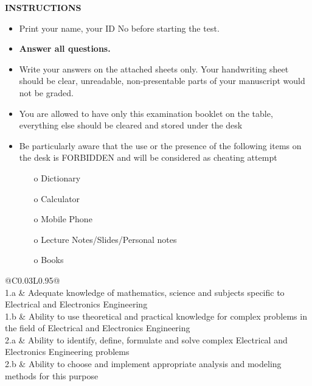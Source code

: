 \documentclass[a4paper, 11pt]{article}
\begin{document}
	\begin{center}
		\large
		\textbf{INSTRUCTIONS}
	\end{center}
	\begin{itemize}
		\setlength{\itemsep}{0pt}
		\setlength{\parskip}{1pt}
		\item Print your name, your ID No before starting the test.
		\item \textbf{Answer all questions.}
		\item Write your answers on the attached sheets only. Your handwriting sheet should be clear, unreadable, non-presentable parts of your manuscript would not be graded.
		\item You are allowed to have only this examination booklet on the table, everything else should be cleared and stored under the desk
		\item Be particularly aware that the use or the presence of the following items on the desk is FORBIDDEN and will be considered as cheating attempt
		\begin{itemize}
			\setlength{\itemsep}{0pt}
			\setlength{\parskip}{1pt}
			\item[o] Dictionary
			\item[o] Calculator
			\item[o] Mobile Phone
			\item[o] Lecture Notes/Slides/Personal notes
			\item[o] Books
		\end{itemize}
	\end{itemize}
	
	\begin{table}[hb!]
		\centering
		\begin{tabular}{@{}C{0.03\linewidth}L{0.95\linewidth}@{}}
			\toprule
			 \\
			\midrule
			1.a & Adequate knowledge of mathematics, science and subjects specific to Electrical and Electronics Engineering \\
			1.b & Ability to use theoretical and practical knowledge for complex problems in the field of Electrical and Electronics Engineering \\
			\midrule
			2.a & Ability to identify, define, formulate and solve complex Electrical and Electronics Engineering problems \\
			2.b & Ability to choose and implement appropriate analysis and modeling methods for this purpose \\
			\bottomrule
		\end{tabular}
	\end{table}
	\unboldmath
\end{document}
